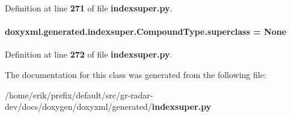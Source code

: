 Definition at line {\bf 271} of file {\bf indexsuper.\+py}.

\paragraph[{superclass}]{\setlength{\rightskip}{0pt plus 5cm}doxyxml.\+generated.\+indexsuper.\+Compound\+Type.\+superclass = None\hspace{0.3cm}{\ttfamily [static]}}\label{classdoxyxml_1_1generated_1_1indexsuper_1_1CompoundType_a7d65dc40377082dd75f3048be8a1914b}


Definition at line {\bf 272} of file {\bf indexsuper.\+py}.



The documentation for this class was generated from the following file\+:\begin{DoxyCompactItemize}
\item 
/home/erik/prefix/default/src/gr-\/radar-\/dev/docs/doxygen/doxyxml/generated/{\bf indexsuper.\+py}\end{DoxyCompactItemize}
